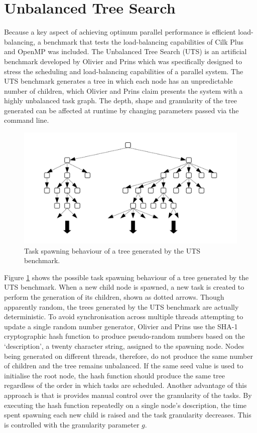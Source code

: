 \documentclass{report}
\begin{document}
\section{Unbalanced Tree Search} \label{Sec:unbalancedtreesearch}

Because a key aspect of achieving optimum parallel performance is efficient load-balancing, a benchmark that tests the load-balancing capabilities of Cilk Plus and OpenMP was included. The Unbalanced Tree Search (UTS) is an artificial benchmark developed by Olivier and Prins\cite{Olivier09} which was specifically designed to stress the scheduling and load-balancing capabilities of a parallel system. The UTS benchmark generates a tree in which each node has an unpredictable number of children, which Olivier and Prins claim presents the system with a highly unbalanced task graph. The depth, shape and granularity of the tree generated can be affected at runtime by changing parameters passed via the command line.
\noindent
\begin{figure}
	\includegraphics[width=\linewidth]{../diagrams/uts_tasks}
	\caption{Task spawning behaviour of a tree generated by the UTS benchmark.}
	\label{Fig:utstasks}
\end{figure}

Figure \ref{Fig:utstasks} shows the possible task spawning behaviour of a tree generated by the UTS benchmark. When a new child node is spawned, a new task is created to perform the generation of its children, shown as dotted arrows. Though apparently random, the trees generated by the UTS benchmark are actually deterministic. To avoid synchronisation across multiple threads attempting to update a single random number generator, Olivier and Prins use the SHA-1 cryptographic hash function to produce pseudo-random numbers based on the `description', a twenty character string, assigned to the spawning node. Nodes being generated on different threads, therefore, do not produce the same number of children and the tree remains unbalanced. If the same seed value is used to initialise the root node, the hash function should produce the same tree regardless of the order in which tasks are scheduled. Another advantage of this approach is that is provides manual control over the granularity of the tasks. By executing the hash function repeatedly on a single node's description, the time spent spawning each new child is raised and the task granularity decreases. This is controlled with the granularity parameter \(g\).
\end{document}
